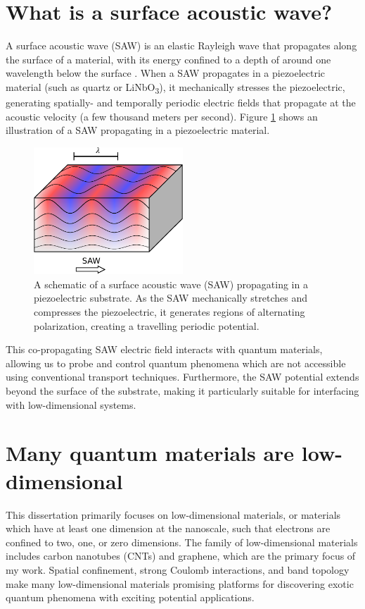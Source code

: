 \documentclass{beavtex_dub_edit}
\begin{document}
\section{What is a surface acoustic wave?}

A surface acoustic wave (SAW) is an elastic Rayleigh wave that propagates along the surface of a material, with its energy confined to a depth of around one wavelength below the surface \cite{rayleigh_waves_1885}. When a SAW propagates in a piezoelectric material (such as quartz or LiNbO\textsubscript{3}), it mechanically stresses the piezoelectric, generating spatially- and temporally periodic electric fields that propagate at the acoustic velocity (a few thousand meters per second). Figure \ref{SAW intro fig} shows an illustration of a SAW propagating in a piezoelectric material. 

\begin{figure}
    \includegraphics[width = 0.5\textwidth]{SAW intro fig.pdf}
    \caption{A schematic of a surface acoustic wave (SAW) propagating in a piezoelectric substrate. As the SAW mechanically stretches and compresses the piezoelectric, it generates regions of alternating polarization, creating a travelling periodic potential.}
    \label{SAW intro fig}
\end{figure}

This co-propagating SAW electric field interacts with quantum materials, allowing us to probe and control quantum phenomena which are not accessible using conventional transport techniques. Furthermore, the SAW potential extends beyond the surface of the substrate, making it particularly suitable for interfacing with low-dimensional systems.


\section{Many quantum materials are low-dimensional}

This dissertation primarily focuses on low-dimensional materials, or materials which have at least one dimension at the nanoscale, such that electrons are confined to two, one, or zero dimensions. The family of low-dimensional materials includes carbon nanotubes (CNTs) and graphene, which are the primary focus of my work. Spatial confinement, strong Coulomb interactions, and band topology make many low-dimensional materials promising platforms for discovering exotic quantum phenomena with exciting potential applications.
\end{document}
